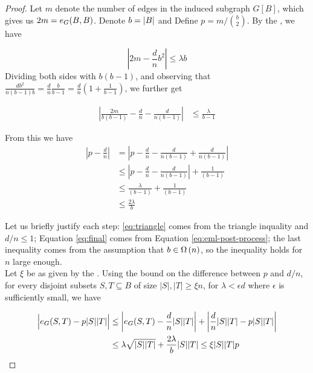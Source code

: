 \documentclass[11pt]{article}
\begin{document}
\begin{proof}
  Let $m$ denote the number of edges in the induced subgraph $G[B]$, which gives us $2m = \CutEdges{B}{B}{G}$.
Denote $b \Def \Size{B}$ and Define $p = m / \binom{b}{2}$. By the , we have

\[ \left| 2m - \frac{d}{n}b^2 \right| \le \lambda b \]
Dividing both sides with $b(b-1)$, and observing that $\frac{db^2}{n(b-1)b} = \frac{d}{n}\frac{b}{b-1} = \frac{d}{n}(1 + \frac{1}{b-1})$, we further get

\begin{align}
\left| \frac{2m}{b(b-1)} - \frac{d}{n} - \frac{d}{n(b-1)} \right| &\le \frac{\lambda}{b-1}  \label{eq:eml-post-process}
\end{align}

From this we have 
\begin{align}
  \left| p - \frac{d}{n}\right| &= \left| p - \frac{d}{n} - \frac{d}{n(b-1)} + \frac{d}{n(b-1)}\right|  \\
                                &\le \left| p - \frac{d}{n} - \frac{d}{n(b-1)} \right| + \frac{1}{(b-1)} \label{eq:triangle}\\
                                &\le \frac{\lambda}{(b-1)} + \frac{1}{(b-1)}  \label{eq:final} \\
  & \le \frac{2\lambda}{b}
\end{align}

Let us briefly justify each step: \eqref{eq:triangle} comes from the triangle inquality and  $d/n \le 1$;
Equation \eqref{eq:final} comes from Equation \eqref{eq:eml-post-process};
the last inequality comes from the assumption that $b \in \BigOmega{n}$, so the inequality holds for $n$ large enough.\\

Let $\xi$ be as given by the . Using the bound on the difference between $p$ and $d/n$, for every disjoint subsets $S, T \subseteq B$ of size $|S|,|T| \ge \xi n$, for $\lambda < \epsilon d$ where $\epsilon$ is sufficiently small, we have

\begin{align*}
  \Bigl| \CutEdges{S}{T}{G}  - p|S||T| \Bigr| &\le \left| \CutEdges{S}{T}{G} - \frac{d}{n}|S||T| \right| + \left| \frac{d}{n}|S||T| - p|S||T| \right| \\
                                    &\le \lambda \sqrt{|S||T|} + \frac{2 \lambda}{b} |S||T| \le \xi |S||T|p 
    \end{align*}


\end{proof}
\end{document}
